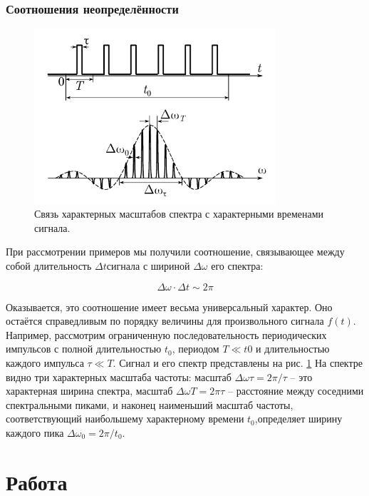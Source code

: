 \documentclass{article}
\begin{document}
\subsubsection{Соотношения неопределённости}
\begin{figure}[H]
    \centering
    \includegraphics[width=0.8\textwidth]{uncertainty.png}
    \caption{Связь характерных масштабов спектра с характерными временами сигнала.} 
    \label{pic_uncertainty}
\end{figure}
При рассмотрении примеров мы получили соотношение, связы­вающее между собой длительность \(\Delta t\)сигнала с шириной
\(\Delta\omega\) его спектра:

\begin{equation}
    \Delta\omega\cdot\Delta t \sim 2\pi
    \label{uncertainty}
\end{equation}

Оказывается, это соотношение имеет весьма универсальный харак­тер. Оно остаётся справедливым
по порядку величины для произволь­ного сигнала \(f(t)\). Например, рассмотрим ограниченную последовательность
периодических импульсов с полной длительностью \(t_0\),  периодом \(T \ll t0\) и длительностью каждого импульса
\(\tau \ll T\). Сигнал и его спектр пред­ставлены на рис. \ref{pic_uncertainty} На спектре видно три характерных
масштаба частоты: масштаб \(\Delta\omega\tau = 2\pi/\tau\) -- это характерная ширина спектра, масштаб \(\Delta\omega T = 
2\pi\tau\) -- расстояние между соседними спектральными пиками, и наконец наименьший мас­штаб частоты, соответствующий
наибольшему характерному времени \(t_0\),определяет ширину каждого пика \(\Delta\omega_0 = 2\pi/t_0\).




\section{Работа}
\end{document}
